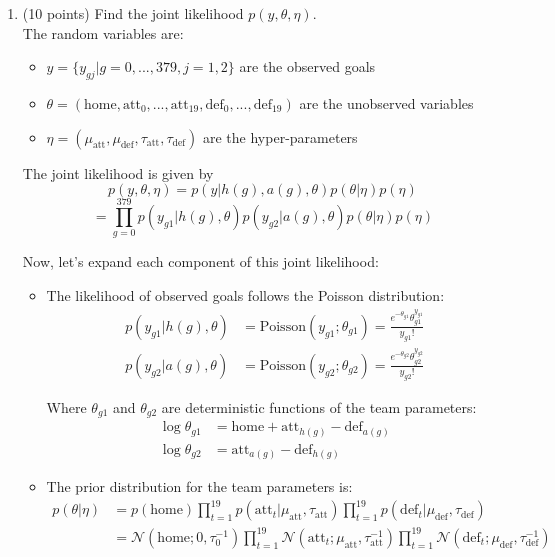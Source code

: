 \documentclass{article}
\begin{document}
\begin{enumerate}
    \item (10 points) Find the joint likelihood $p(y, \theta, \eta)$.
    \\ The random variables are:
    \begin{itemize}
    \item $y = \{y_{gj}|g = 0, ..., 379, j = 1, 2\}$ are the observed goals
    \item $\theta = (\text{home}, \text{att}_0, ..., \text{att}_{19}, \text{def}_0, ..., \text{def}_{19})$ are the unobserved variables
    \item $\eta = (\mu_{\text{att}}, \mu_{\text{def}}, \tau_{\text{att}}, \tau_{\text{def}})$ are the hyper-parameters
    \end{itemize}
    The joint likelihood is given by
    \[
        p(y, \theta, \eta) = p(y|h(g), a(g), \theta)p(\theta|\eta)p(\eta)
    \]
    \[
        = \prod_{g=0}^{379} p(y_{g1}|h(g), \theta)p(y_{g2}|a(g), \theta)p(\theta|\eta)p(\eta)
    \]
    
    Now, let's expand each component of this joint likelihood:
    
    \begin{itemize}
    \item The likelihood of observed goals follows the Poisson distribution:
    \begin{align}
    p(y_{g1}|h(g), \theta) &= \text{Poisson}(y_{g1}; \theta_{g1}) = \frac{e^{-\theta_{g1}}\theta_{g1}^{y_{g1}}}{y_{g1}!} \\
    p(y_{g2}|a(g), \theta) &= \text{Poisson}(y_{g2}; \theta_{g2}) = \frac{e^{-\theta_{g2}}\theta_{g2}^{y_{g2}}}{y_{g2}!}
    \end{align}
    
    Where $\theta_{g1}$ and $\theta_{g2}$ are deterministic functions of the team parameters:
    \begin{align}
    \log \theta_{g1} &= \text{home} + \text{att}_{h(g)} - \text{def}_{a(g)} \\
    \log \theta_{g2} &= \text{att}_{a(g)} - \text{def}_{h(g)}
    \end{align}
    
    \item The prior distribution for the team parameters is:
    \begin{align}
    p(\theta|\eta) &= p(\text{home}) \prod_{t=1}^{19} p(\text{att}_t|\mu_{\text{att}}, \tau_{\text{att}}) \prod_{t=1}^{19} p(\text{def}_t|\mu_{\text{def}}, \tau_{\text{def}}) \\
    &= \mathcal{N}(\text{home}; 0, \tau_0^{-1}) \prod_{t=1}^{19} \mathcal{N}(\text{att}_t; \mu_{\text{att}}, \tau_{\text{att}}^{-1}) \prod_{t=1}^{19} \mathcal{N}(\text{def}_t; \mu_{\text{def}}, \tau_{\text{def}}^{-1})
    \end{align}
    

\end{itemize}
\end{enumerate}
\end{document}
